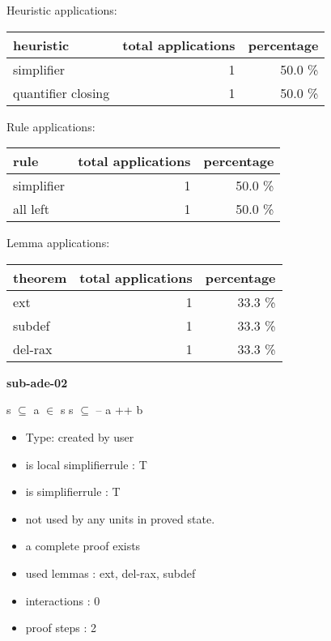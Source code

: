 \documentclass[a4paper]{article}
\begin{document}
\medskip


Heuristic applications:

\begin{supertabular}{l|r|r}
heuristic	& total applications & percentage \\ \hline
simplifier & 1 & 50.0 \% \\
quantifier closing & 1 & 50.0 \% \\

\end{supertabular}

Rule applications:

\begin{supertabular}{l|r|r}
rule	        & total applications & percentage \\ \hline
simplifier & 1 & 50.0 \% \\
all left & 1 & 50.0 \% \\

\end{supertabular}

Lemma applications:

\begin{supertabular}{l|r|r}
theorem	        & total applications & percentage \\ \hline
ext & 1 & 33.3 \% \\
subdef & 1 & 33.3 \% \\
del-rax & 1 & 33.3 \% \\

\end{supertabular}
\pagebreak

{\LARGE\bf sub-ade-02}\label{lemma-sub-ade-02}

\medskip

 \Fol s $\subseteq$  \And \Not a $\in$ s \Imp s $\subseteq$  -- a ++ b

\begin{itemize}

\item Type: created by user

\item is local simplifierrule : T
\item is simplifierrule : T
\item not used by any units in proved state.
\item       a complete proof exists
\item       used lemmas  : ext, del-rax, subdef
\item       interactions : 0
\item       proof steps  : 2
\end{itemize}
\end{document}
